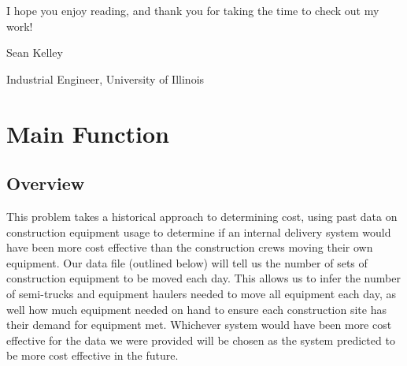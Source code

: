 \documentclass[letterpaper,10pt,english]{sphinxmanual}
\begin{document}
I hope you enjoy reading, and thank you for taking the time to check out my
work!

Sean Kelley

Industrial Engineer, University of Illinois


\chapter{Main Function}
\label{\detokenize{main:main}}\label{\detokenize{main::doc}}\label{\detokenize{main:main-function}}

\section{Overview}
\label{\detokenize{main:overview}}
This problem takes a historical approach to determining cost, using past data
on construction equipment usage to determine if an internal delivery system
would have been more cost effective than the construction crews moving their
own equipment. Our data file (outlined below) will tell us the number of sets
of construction equipment to be moved each day. This allows us to infer the
number of semi-trucks and equipment haulers needed to move all equipment each
day, as well how much equipment needed on hand to ensure each construction
site has their demand for equipment met. Whichever system would have been
more cost effective for the data we were provided will be chosen as the
system predicted to be more cost effective in the future.
\end{document}

